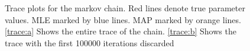 \documentclass{report}
\theoremstyle{definition}
\begin{document}
\begin{figure}[H]
  \centering
  \centering
  \centering
  \caption{Trace plots for the markov chain. Red lines denote true parameter values. MLE marked by blue lines. MAP marked by orange lines. \ref{trace:a} Shows the entire trace of the chain. \ref{trace:b} Shows the trace with the first 100000 iterations discarded}
  \label{fig:trace}
\end{figure}
\end{document}
